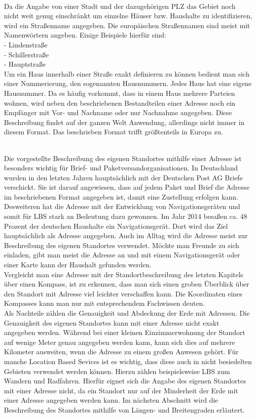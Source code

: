 \\Da die Angabe von einer Stadt und der dazugehörigen PLZ das Gebiet noch nicht weit genug einschränkt um einzelne Häuser bzw. Haushalte zu identifizieren, wird ein Straßenname angegeben.
Die europäischen Straßennamen sind meist mit Namenwörtern angeben.
Einige Beispiele hierfür sind:
\\-	Lindenstraße
\\-	Schillerstraße
\\-	Hauptstraße
\\Um ein Haus innerhalb einer Straße exakt definieren zu können bedient man sich einer Nummerierung, den sogenannten Hausnummern. Jedes Haus hat eine eigene Hausnummer. 
Da es häufig vorkommt, dass in einem Haus mehrere Parteien wohnen, wird neben den beschriebenen Bestandteilen einer Adresse noch ein Empfänger mit Vor- und Nachname oder nur Nachnahme angegeben.
Diese Beschreibung findet auf der ganzen Welt Anwendung, allerdings nicht immer in diesem Format. Das beschrieben Format trifft größtenteils in Europa zu. 

\\Die vorgestellte Beschreibung des eigenen Standortes mithilfe einer Adresse ist besonders wichtig für Brief- und Paketversandorganisationen. In Deutschland wurden in den letzten Jahren hauptsächlich mit der Deutschen Post AG Briefe verschickt. Sie ist darauf angewiesen, dass auf jedem Paket und Brief die Adresse im beschriebenen Format angegeben ist, damit eine Zustellung erfolgen kann.
Desweiteren hat die Adresse mit der Entwicklung von Navigationsgeräten und somit für LBS stark an Bedeutung dazu gewonnen. Im Jahr 2014 besaßen ca. 48 Prozent der deutschen Haushalte ein Navigationsgerät. \cite{Navi} Dort wird das Ziel hauptsächlich als Adresse angegeben. 
Auch im Alltag wird die Adresse meist zur Beschreibung des eigenen Standortes verwendet. Möchte man Freunde zu sich einladen, gibt man meist die Adresse an und mit einem Navigationsgerät oder einer Karte kann der Haushalt gefunden werden.
\\Vergleicht man eine Adresse mit der Standortbeschreibung des letzten Kapitels über einen Kompass, ist zu erkennen, dass man sich einen groben Überblick über den Standort mit Adresse viel leichter verschaffen kann. Die Koordinaten eines Kompasses kann man nur mit entsprechendem Fachwissen deuten. 
\\Als Nachteile zählen die Genauigkeit und Abdeckung der Erde mit Adressen. Die Genauigkeit des eigenen Standortes kann mit einer Adresse nicht exakt angegeben werden. Während bei einer kleinen Einzimmerwohnung der Standort auf wenige Meter genau angegeben werden kann, kann sich dies auf mehrere Kilometer ausweiten, wenn die Adresse zu einem großen Anwesen gehört. Für manche Location Based Sevices ist es wichtig, dass diese auch in nicht besiedelten Gebieten verwendet werden können. Hierzu zählen beispielsweise LBS zum Wandern und Radfahren. Hierfür eignet sich die Angabe des eigenen Standortes mit einer Adresse nicht, da ein Standort nur auf der Minderheit der Erde mit einer Adresse angegeben werden kann. 
Im nächsten Abschnitt wird die Beschreibung des Standortes mithilfe von Längen- und Breitengraden erläutert.

